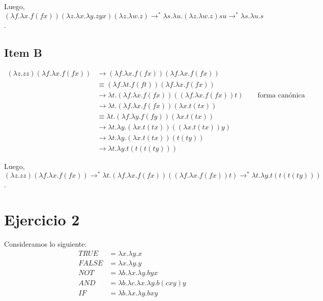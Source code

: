 \documentclass{article}
\begin{document}
Luego, $(\lambda f. \lambda x. f(fx)) (\lambda z. \lambda x. \lambda y. zyx) (\lambda z. \lambda w. z) \to^* \lambda s.\lambda u. (\lambda z.\lambda w. z)su \to^* \lambda s.\lambda u. s$.

\subsection*{Item B}
\begin{equation*}
  \begin{aligned}
    (\lambda z. zz)(\lambda f.\lambda x. f(fx)) &\to (\lambda f.\lambda x. f(fx))(\lambda f.\lambda x. f(fx)) \\ 
                                                &\equiv (\lambda f.\lambda t. f(ft))(\lambda f.\lambda x. f(fx)) \\ 
                                                &\to \lambda t. (\lambda f.\lambda x. f(fx))((\lambda f.\lambda x. f(fx))t) \qquad\text{forma canónica} \\ 
                                                &\to \lambda t. (\lambda f.\lambda x. f(fx))(\lambda x. t(tx)) \\ 
                                                &\equiv \lambda t. (\lambda f.\lambda y. f(fy))(\lambda x. t(tx)) \\ 
                                                &\to \lambda t.\lambda y. (\lambda x. t(tx))((\lambda x. t(tx))y) \\ 
                                                &\to \lambda t.\lambda y. (\lambda x. t(tx))(t(ty)) \\ 
                                                &\to \lambda t.\lambda y. t(t(t(ty))) 
  \end{aligned}
\end{equation*}

Luego, $(\lambda z. zz)(\lambda f.\lambda x. f(fx)) \to^* \lambda t. (\lambda f.\lambda x. f(fx))((\lambda f.\lambda x. f(fx))t) \to^* \lambda t.\lambda y. t(t(t(ty)))$.

\section*{Ejercicio 2}
Consideramos lo siguiente:
\begin{equation*}
  \begin{aligned}
    TRUE &= \lambda x.\lambda y. x \\ 
    FALSE &= \lambda x.\lambda y. y \\ 
    NOT &= \lambda b.\lambda x.\lambda y. byx \\ 
    AND &= \lambda b.\lambda c.\lambda x.\lambda y. b(cxy)y \\ 
    IF &= \lambda b.\lambda x.\lambda y. bxy 
  \end{aligned}
\end{equation*}
\end{document}
